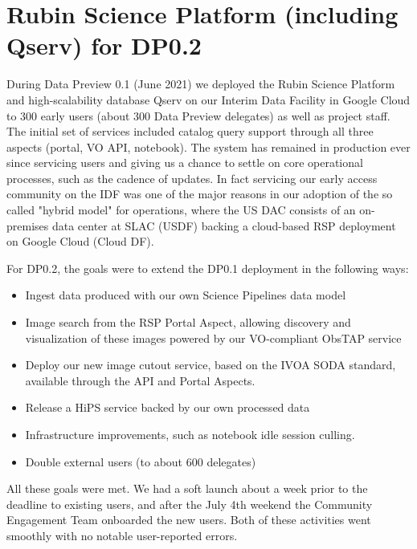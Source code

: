 \section{Rubin Science Platform (including Qserv) for DP0.2 } \label{sec:rsp}

During Data Preview 0.1 (June 2021) we deployed the Rubin Science Platform and high-scalability database Qserv on our Interim Data Facility in Google Cloud to 300 early users (about 300 Data Preview delegates) as well as project staff. The initial set of services included catalog query support through all three aspects (portal, VO API, notebook). The system has remained in production ever since servicing users and giving us a chance to settle on core operational processes, such as the cadence of updates. In fact servicing our early access community on the IDF was one of the major reasons in our adoption of the so called "hybrid model" for operations, where the US DAC consists of an on-premises data center at SLAC (USDF) backing a cloud-based RSP deployment on Google Cloud (Cloud DF).

For DP0.2, the goals were to extend the DP0.1 deployment in the following ways:

\begin{itemize}
    \item Ingest data produced with our own Science Pipelines data model
    \item Image search from the RSP Portal Aspect, allowing discovery and visualization of these images powered by our VO-compliant ObsTAP service
    \item Deploy our new image cutout service, based on the IVOA SODA standard, available through the API and Portal Aspects.
    \item Release a HiPS service backed by our own processed data
    \item Infrastructure improvements, such as notebook idle session culling.
    \item Double external users (to about 600 delegates)
\end{itemize}

All these goals were met. We had a soft launch about a week prior to the deadline to existing users, and after the July 4th weekend the Community Engagement Team onboarded the new users. Both of these activities went smoothly with no notable user-reported errors.



